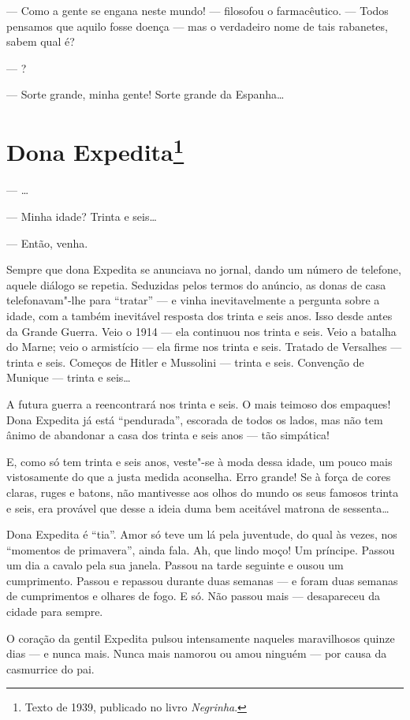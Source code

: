 --- Como a gente se engana neste mundo! --- filosofou o farmacêutico.
--- Todos pensamos que aquilo fosse doença --- mas o verdadeiro nome de
tais rabanetes, sabem qual é?

--- ?

--- Sorte grande, minha gente! Sorte grande da Espanha\ldots{}

\chapter{Dona Expedita\footnote[*]{Texto de 1939, publicado no livro \emph{Negrinha}.}}

--- \ldots{}

--- Minha idade? Trinta e seis\ldots{}

--- Então, venha.

Sempre que dona Expedita se anunciava no jornal, dando um número de
telefone, aquele diálogo se repetia. Seduzidas pelos termos do anúncio,
as donas de casa telefonavam"-lhe para ``tratar'' --- e vinha
inevitavelmente a pergunta sobre a idade, com a também inevitável
resposta dos trinta e seis anos. Isso desde antes da Grande Guerra. Veio
o 1914 --- ela continuou nos trinta e seis. Veio a batalha do Marne;
veio o armistício --- ela firme nos trinta e seis. Tratado de Versalhes
--- trinta e seis. Começos de Hitler e Mussolini --- trinta e seis.
Convenção de Munique --- trinta e seis\ldots{}

A futura guerra a reencontrará nos trinta e seis. O mais teimoso dos
empaques! Dona Expedita já está ``pendurada'', escorada de todos os
lados, mas não tem ânimo de abandonar a casa dos trinta e seis anos ---
tão simpática!

E, como só tem trinta e seis anos, veste"-se à moda dessa idade, um pouco
mais vistosamente do que a justa medida aconselha. Erro grande! Se à
força de cores claras, ruges e batons, não mantivesse aos olhos do mundo
os seus famosos trinta e seis, era provável que desse a ideia duma bem
aceitável matrona de sessenta\ldots{}

Dona Expedita é ``tia''. Amor só teve um lá pela juventude, do qual às
vezes, nos ``momentos de primavera'', ainda fala. Ah, que lindo moço! Um
príncipe. Passou um dia a cavalo pela sua janela. Passou na tarde
seguinte e ousou um cumprimento. Passou e repassou durante duas semanas
--- e foram duas semanas de cumprimentos e olhares de fogo. E só. Não
passou mais --- desapareceu da cidade para sempre.

O coração da gentil Expedita pulsou intensamente naqueles maravilhosos
quinze dias --- e nunca mais. Nunca mais namorou ou amou ninguém --- por
causa da casmurrice do pai.

